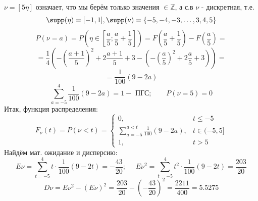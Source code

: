 \begin{enumerate}
	$\nu = [5 \eta]$ означает, что мы берём только значения $\in \mathbb{Z}$, а с.в $\nu$ - дискретная, т.е.
	\[ \supp(\eta) = [-1, 1], \supp (\nu) = \{-5,-4,-3,\dots,3,4,5\} \]
	\[ P(\nu = a) = P\left( \eta \in \left[ \frac{a}{5}; \frac{a}{5} + \frac{1}{5} \right] \right) = F\left(\frac{a}{5} + \frac{1}{5}\right) - F\left(\frac{a}{5}\right) = \]
	\[ = \frac{1}{4} \left( - \left( \frac{a+1}{5} \right)^2 + 2 \frac{a+1}{5} + 3 - \left( - \left(\frac{a}{5}\right)^2 + 2 \frac{a}{5} + 3 \right) \right) = \]
	\[ = \frac{1}{100} (9 - 2a) \]
	\[ \sum_{a=-5}^{4} \frac{1}{100} (9 - 2a) = 1 - \text{ ПГС}; ~~~~~~~~~ P(\nu = 5) = 0 \]
	Итак, функция распределения:
	\[
	F_{\nu} (t) = P(\nu < t) =
	\begin{cases}
		0, &t \le -5 \\
		\sum\limits_{a=-5}^{a < t} \frac{1}{100} (9 - 2a), &t \in (-5,5] \\
		1, &t > 5
	\end{cases}
	\]
	Найдём мат. ожидание и дисперсию:
	\[ E\nu = \sum_{t=-5}^{4} t \cdot \frac{1}{100} (9 - 2t) = -\frac{43}{20}; ~~~~~~ E\nu^2 = \sum_{t=-5}^{4} t^2 \cdot \frac{1}{100} (9 - 2t) = \frac{203}{20} \]
	\[ D\nu = E\nu^2 - (E\nu)^2 = \frac{203}{20} - \left( -\frac{43}{20} \right)^2 = \frac{2211}{400} = 5.5275 \]
	

\end{enumerate}

